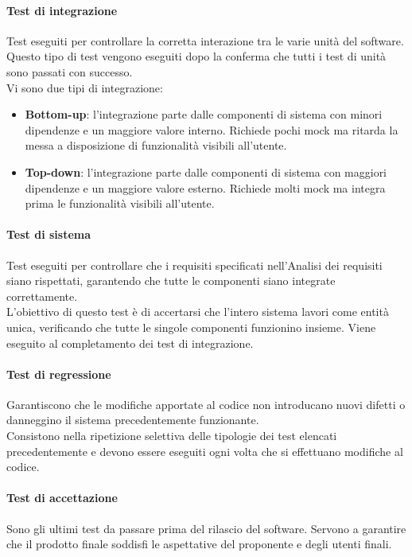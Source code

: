 \documentclass[10pt]{article}
\begin{document}
\begin{justify}
    \paragraph{Test di integrazione}
    Test eseguiti per controllare la corretta interazione tra le varie unità del software. Questo tipo di test vengono eseguiti dopo la conferma che tutti i test di unità sono passati con successo.\\
    Vi sono due tipi di integrazione:
    \begin{itemize}
      \item \textbf{Bottom-up}: l'integrazione parte dalle componenti di sistema con minori dipendenze e un maggiore valore interno. Richiede pochi mock ma ritarda la messa a disposizione di funzionalità visibili all'utente.
      \item \textbf{Top-down}: l'integrazione parte dalle componenti di sistema con maggiori dipendenze e un maggiore valore esterno. Richiede molti mock ma integra prima le funzionalità visibili all'utente.
    \end{itemize}

    \paragraph{Test di sistema}
    Test eseguiti per controllare che i requisiti specificati nell'Analisi dei requisiti siano rispettati, garantendo che tutte le componenti siano integrate correttamente.\\
    L'obiettivo di questo test è di accertarsi che l'intero sistema lavori come entità unica, verificando che tutte le singole componenti funzionino insieme. Viene eseguito al completamento dei test di integrazione.

    \paragraph{Test di regressione}
    Garantiscono che le modifiche apportate al codice non introducano nuovi difetti o danneggino il sistema precedentemente funzionante.\\
    Consistono nella ripetizione selettiva delle tipologie dei test elencati precedentemente e devono essere eseguiti ogni volta che si effettuano modifiche al codice.

    \paragraph{Test di accettazione}
    Sono gli ultimi test da passare prima del rilascio del software. Servono a garantire che il prodotto finale soddisfi le aspettative del proponente e degli utenti finali.


\end{justify}
\end{document}
